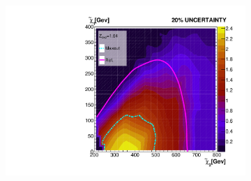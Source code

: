 \begin{figure}[H]
{\begin{subfigure}{.45\textwidth}
        \includegraphics[width=\textwidth]{Figures/MLResults/NN/SUSY/Comparison/Limits/MaxOutLimit20.pdf}
        \vspace{-0.75cm}
        \vspace*{-33.1ex}  %
        \begin{center}
        \tiny
        \hspace{-50.5ex}
        \cite{atlas_search_2021}
        \end{center}
        \vspace*{34.1ex}
        \vspace{-1.cm}
        \caption{}
        \label{fig:MaxOutLimit20}
    \end{subfigure}
    }
\end{figure}
